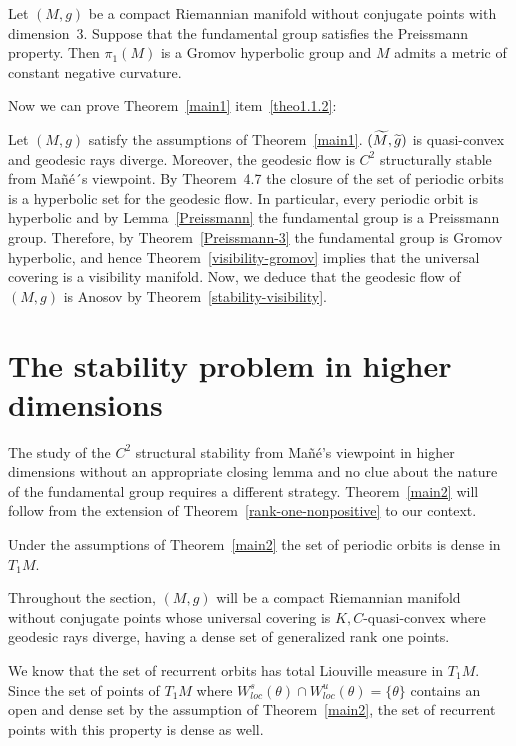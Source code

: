 \documentclass[AHL,Unicode,longabstracts,published]{cedram}
\let\oldtilde\tilde
\renewcommand*{\tilde}[1]{\mathchoice{\widetilde{#1}}{\widetilde{#1}}{\oldtilde{#1}}{\oldtilde{#1}}}
\begin{document}
\begin{theo}\label{Preissmann-3}
Let $(M,g)$ be a compact Riemannian manifold without conjugate points with dimension~3. Suppose that the fundamental group satisfies the Preissmann property. Then $\pi_{1}(M)$ is a Gromov hyperbolic group and $M$ admits a metric of constant negative curvature.
\end{theo}

Now we can prove Theorem~\ref{main1} item~\eqref{theo1.1.2}:

Let $(M,g)$ satisfy the assumptions of Theorem~\ref{main1}. $(\tilde{M}, \tilde{g})$ is quasi-convex and geodesic rays diverge. Moreover, the geodesic flow is $C^{2}$ structurally stable from Mañé´s viewpoint. By Theorem~4.7 the closure of the set of periodic orbits is a hyperbolic set for the geodesic flow. In particular, every periodic orbit is hyperbolic and by Lemma~\ref{Preissmann} the fundamental group is a Preissmann group. Therefore, by Theorem~\ref{Preissmann-3} the fundamental group is Gromov hyperbolic, and hence Theorem~\ref{visibility-gromov} implies that the universal covering is a visibility manifold. Now, we deduce that the geodesic flow of $(M,g)$ is Anosov by Theorem~\ref{stability-visibility}.

\section{The stability problem in higher dimensions}\label{SEChigher}

The study of the $C^{2}$ structural stability from Mañé's viewpoint in higher dimensions without an appropriate closing lemma and no clue about the nature of the fundamental group requires a different strategy. Theorem~\ref{main2} will follow from the extension of Theorem~\ref{rank-one-nonpositive} to our context.

\begin{theo}\label{density2}
Under the assumptions of Theorem~\ref{main2} the set of periodic orbits is dense in $T_{1}M$.
\end{theo}

Throughout the section, $(M,g)$ will be a compact Riemannian manifold without conjugate points whose universal covering is $K,C$-quasi-convex where geodesic rays diverge, having a dense set of generalized rank one points.

We know that the set of recurrent orbits has total Liouville measure in $T_{1}M$. Since the set of points of $T_{1}M$ where $W^{s}_{loc}(\theta) \cap W^{u}_{loc}(\theta) = \{ \theta\}$ contains an open and dense set by the assumption of Theorem~\ref{main2}, the set of recurrent points with this property is dense as well.
\end{document}
